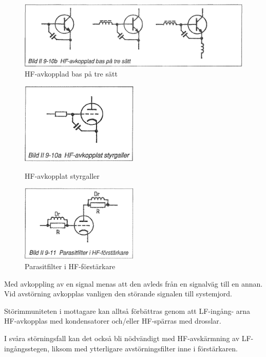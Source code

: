 \begin{figure}
  \includegraphics[width=\textwidth]{images/bild_2_9-10b}
  \caption{HF-avkopplad bas på tre sätt}
  \label{fig:bildII9-10b}
\end{figure}

\begin{figure}
  \includegraphics[width=0.5\textwidth]{images/bild_2_9-10a}
  \caption{HF-avkopplat styrgaller}
  \label{fig:bildII9-10a}

  \includegraphics[width=0.5\textwidth]{images/bild_2_9-11}
  \caption{Parasitfilter i HF-förstärkare}
  \label{fig:bildII9-11}
\end{figure}

Med avkoppling av en signal menas att den avleds från en signalväg
till en annan. Vid avstörning avkopplas vanligen den störande
signalen till systemjord.

Störimmuniteten i mottagare kan alltså förbättras genom att LF-ingång-
arna HF-avkopplas med kondensatorer och/eller HF-spärras med drosslar.

I svåra störningsfall kan det också bli nödvändigt med HF-avskärmning
av LF-ingångsstegen, liksom med ytterligare avstörningsfilter inne i
förstärkaren.


